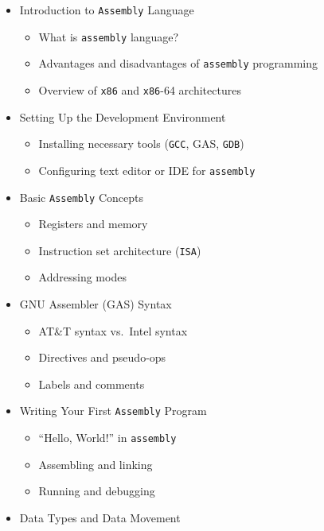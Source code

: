 \documentclass[
]{article}
\providecommand{\tightlist}{%
  \setlength{\itemsep}{0pt}\setlength{\parskip}{0pt}}
\begin{document}
\begin{itemize}
\tightlist
\item
  Introduction to \texttt{Assembly} Language

  \begin{itemize}
  \tightlist
  \item
    What is \texttt{assembly} language?
  \item
    Advantages and disadvantages of \texttt{assembly} programming
  \item
    Overview of \texttt{x86} and \texttt{x86}-64 architectures
  \end{itemize}
\item
  Setting Up the Development Environment

  \begin{itemize}
  \tightlist
  \item
    Installing necessary tools (\texttt{GCC}, GAS, \texttt{GDB})
  \item
    Configuring text editor or IDE for \texttt{assembly}
  \end{itemize}
\item
  Basic \texttt{Assembly} Concepts

  \begin{itemize}
  \tightlist
  \item
    Registers and memory
  \item
    Instruction set architecture (\texttt{ISA})
  \item
    Addressing modes
  \end{itemize}
\item
  GNU Assembler (GAS) Syntax

  \begin{itemize}
  \tightlist
  \item
    AT\&T syntax vs.~Intel syntax
  \item
    Directives and pseudo-ops
  \item
    Labels and comments
  \end{itemize}
\item
  Writing Your First \texttt{Assembly} Program

  \begin{itemize}
  \tightlist
  \item
    ``Hello, World!'' in \texttt{assembly}
  \item
    Assembling and linking
  \item
    Running and debugging
  \end{itemize}
\item
  Data Types and Data Movement


\end{itemize}
\end{document}
